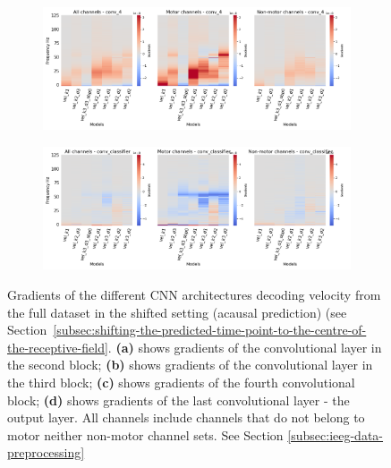 \begin{figure}[!htbp]\ContinuedFloat

\begin{subfigure}[b]{\textwidth}
   \includegraphics[width=1\linewidth]{img/appendix/A/conv-4/sm/vel-model-gradients_all_kinds}
   \caption{}
   \label{fig:vel-shifted-grads-conv-4}
\end{subfigure}

\begin{subfigure}[b]{\textwidth}
   \includegraphics[width=1\linewidth]{img/appendix/A/conv-classifier/sm/vel-model-gradients_all_kinds}
   \caption{}
   \label{fig:vel-shifted-grads-conv-classifier}
\end{subfigure}

\caption[]{Gradients of the different CNN architectures decoding velocity from the full dataset in the shifted setting (acausal prediction) (see Section~\ref{subsec:shifting-the-predicted-time-point-to-the-centre-of-the-receptive-field}. \textbf{(a)} shows gradients of the convolutional layer in the second block; \textbf{(b)} shows gradients of the convolutional layer in the third block; \textbf{(c)} shows gradients of the fourth convolutional block; \textbf{(d)} shows gradients of the last convolutional layer - the output layer. All channels include channels that do not belong to motor neither non-motor channel sets. See Section \ref{subsec:ieeg-data-preprocessing}}
\label{fig:vel-shifted-grads}
\end{figure}
\clearpage
